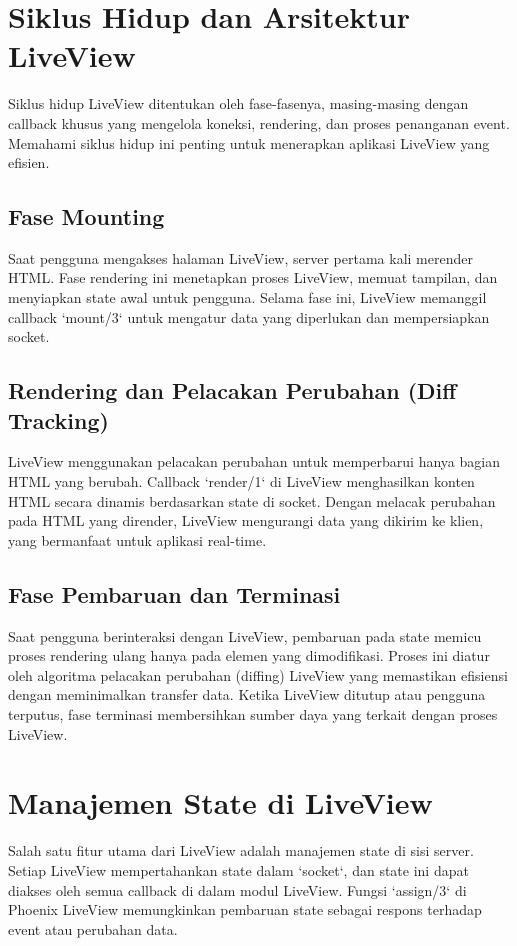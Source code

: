 \section{Siklus Hidup dan Arsitektur LiveView}
Siklus hidup LiveView ditentukan oleh fase-fasenya, masing-masing dengan callback khusus yang mengelola koneksi, rendering, dan proses penanganan event. Memahami siklus hidup ini penting untuk menerapkan aplikasi LiveView yang efisien.

\subsection{Fase Mounting}
Saat pengguna mengakses halaman LiveView, server pertama kali merender HTML. Fase rendering ini menetapkan proses LiveView, memuat tampilan, dan menyiapkan state awal untuk pengguna. Selama fase ini, LiveView memanggil callback `mount/3` untuk mengatur data yang diperlukan dan mempersiapkan socket.

\subsection{Rendering dan Pelacakan Perubahan (Diff Tracking)}
LiveView menggunakan pelacakan perubahan untuk memperbarui hanya bagian HTML yang berubah. Callback `render/1` di LiveView menghasilkan konten HTML secara dinamis berdasarkan state di socket. Dengan melacak perubahan pada HTML yang dirender, LiveView mengurangi data yang dikirim ke klien, yang bermanfaat untuk aplikasi real-time.

\subsection{Fase Pembaruan dan Terminasi}
Saat pengguna berinteraksi dengan LiveView, pembaruan pada state memicu proses rendering ulang hanya pada elemen yang dimodifikasi. Proses ini diatur oleh algoritma pelacakan perubahan (diffing) LiveView yang memastikan efisiensi dengan meminimalkan transfer data. Ketika LiveView ditutup atau pengguna terputus, fase terminasi membersihkan sumber daya yang terkait dengan proses LiveView.

\section{Manajemen State di LiveView}
Salah satu fitur utama dari LiveView adalah manajemen state di sisi server. Setiap LiveView mempertahankan state dalam `socket`, dan state ini dapat diakses oleh semua callback di dalam modul LiveView. Fungsi `assign/3` di Phoenix LiveView memungkinkan pembaruan state sebagai respons terhadap event atau perubahan data.

